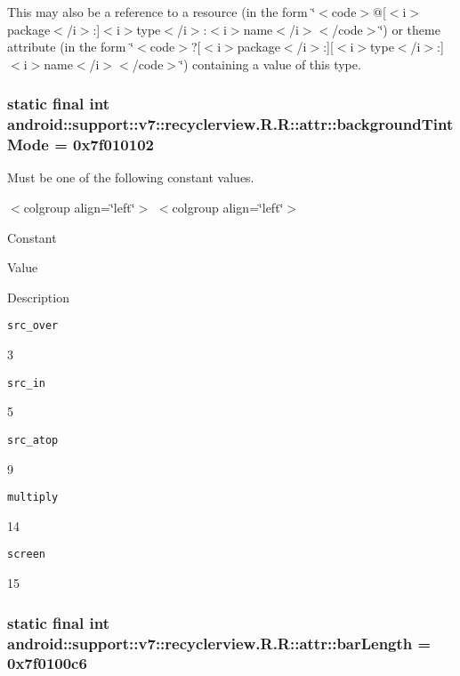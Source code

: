 This may also be a reference to a resource (in the form \char`\"{}$<$code$>$@\mbox{[}$<$i$>$package$<$/i$>$:\mbox{]}$<$i$>$type$<$/i$>$:$<$i$>$name$<$/i$>$$<$/code$>$\char`\"{}) or theme attribute (in the form \char`\"{}$<$code$>$?\mbox{[}$<$i$>$package$<$/i$>$:\mbox{]}\mbox{[}$<$i$>$type$<$/i$>$:\mbox{]}$<$i$>$name$<$/i$>$$<$/code$>$\char`\"{}) containing a value of this type. \hypertarget{classandroid_1_1support_1_1v7_1_1recyclerview_1_1_r_1_1attr_a0752cb79902fb71c43b8c51b2d3bfa0}{
\subsubsection[{backgroundTintMode}]{\setlength{\rightskip}{0pt plus 5cm}static final int android::support::v7::recyclerview.R.R::attr::backgroundTintMode = 0x7f010102}}
\label{classandroid_1_1support_1_1v7_1_1recyclerview_1_1_r_1_1attr_a0752cb79902fb71c43b8c51b2d3bfa0}


Must be one of the following constant values. \begin{TabularC}{0}
\hline
\end{TabularC}
$<$colgroup align=\char`\"{}left\char`\"{}$>$ $<$colgroup align=\char`\"{}left\char`\"{}$>$ 

Constant

Value

Description 

{\tt src\_\-over}

3

{\tt src\_\-in}

5

{\tt src\_\-atop}

9

{\tt multiply}

14

{\tt screen}

15\hypertarget{classandroid_1_1support_1_1v7_1_1recyclerview_1_1_r_1_1attr_ac63881774c597662c8d28402cfe86f1}{
\subsubsection[{barLength}]{\setlength{\rightskip}{0pt plus 5cm}static final int android::support::v7::recyclerview.R.R::attr::barLength = 0x7f0100c6}}
\label{classandroid_1_1support_1_1v7_1_1recyclerview_1_1_r_1_1attr_ac63881774c597662c8d28402cfe86f1}


